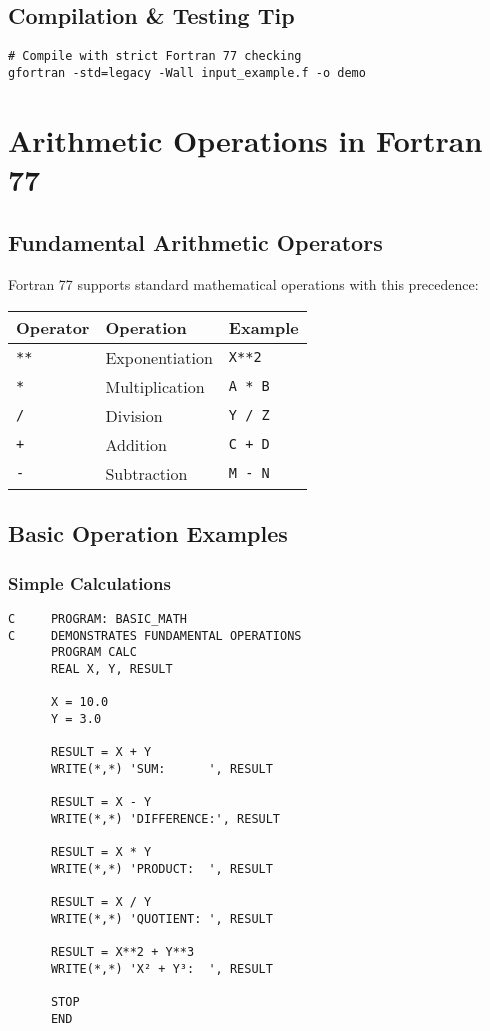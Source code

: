 \documentclass{book}
\begin{document}
\subsection*{Compilation \& Testing Tip}
\begin{verbatim}
# Compile with strict Fortran 77 checking
gfortran -std=legacy -Wall input_example.f -o demo
\end{verbatim}

\section{Arithmetic Operations in Fortran 77}

\subsection*{Fundamental Arithmetic Operators}
Fortran 77 supports standard mathematical operations with this precedence:
\begin{center}
\begin{tabular}{|l|l|l|}
\hline
\textbf{Operator} & \textbf{Operation} & \textbf{Example} \\ 
\hline
\texttt{**} & Exponentiation & \texttt{X**2} \\
\texttt{*} & Multiplication & \texttt{A * B} \\
\texttt{/} & Division & \texttt{Y / Z} \\
\texttt{+} & Addition & \texttt{C + D} \\
\texttt{-} & Subtraction & \texttt{M - N} \\
\hline
\end{tabular}
\end{center}

\subsection*{Basic Operation Examples}

\subsubsection*{Simple Calculations}
\begin{verbatim}
C     PROGRAM: BASIC_MATH
C     DEMONSTRATES FUNDAMENTAL OPERATIONS
      PROGRAM CALC
      REAL X, Y, RESULT
      
      X = 10.0
      Y = 3.0
      
      RESULT = X + Y
      WRITE(*,*) 'SUM:      ', RESULT
      
      RESULT = X - Y
      WRITE(*,*) 'DIFFERENCE:', RESULT
      
      RESULT = X * Y
      WRITE(*,*) 'PRODUCT:  ', RESULT
      
      RESULT = X / Y
      WRITE(*,*) 'QUOTIENT: ', RESULT
      
      RESULT = X**2 + Y**3
      WRITE(*,*) 'X² + Y³:  ', RESULT
      
      STOP
      END
\end{verbatim}
\end{document}
